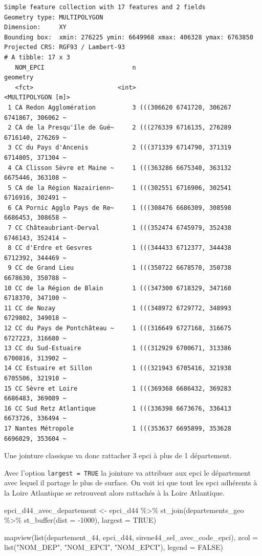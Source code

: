 \documentclass[
]{book}
\newenvironment{Shaded}{\begin{snugshade}}{\end{snugshade}}
\newcommand{\AttributeTok}[1]{\textcolor[rgb]{0.77,0.63,0.00}{#1}}
\newcommand{\ConstantTok}[1]{\textcolor[rgb]{0.00,0.00,0.00}{#1}}
\newcommand{\DecValTok}[1]{\textcolor[rgb]{0.00,0.00,0.81}{#1}}
\newcommand{\FunctionTok}[1]{\textcolor[rgb]{0.00,0.00,0.00}{#1}}
\newcommand{\NormalTok}[1]{#1}
\newcommand{\OtherTok}[1]{\textcolor[rgb]{0.56,0.35,0.01}{#1}}
\newcommand{\SpecialCharTok}[1]{\textcolor[rgb]{0.00,0.00,0.00}{#1}}
\newcommand{\StringTok}[1]{\textcolor[rgb]{0.31,0.60,0.02}{#1}}
\begin{document}
\begin{verbatim}
Simple feature collection with 17 features and 2 fields
Geometry type: MULTIPOLYGON
Dimension:     XY
Bounding box:  xmin: 276225 ymin: 6649968 xmax: 406328 ymax: 6763850
Projected CRS: RGF93 / Lambert-93
# A tibble: 17 x 3
   NOM_EPCI                        n                                    geometry
   <fct>                       <int>                          <MULTIPOLYGON [m]>
 1 CA Redon Agglomération          3 (((306620 6741720, 306267 6741867, 306062 ~
 2 CA de la Presqu'île de Gué~     2 (((276339 6716135, 276289 6716140, 276269 ~
 3 CC du Pays d'Ancenis            2 (((371339 6714790, 371319 6714805, 371304 ~
 4 CA Clisson Sèvre et Maine ~     1 (((363286 6675340, 363132 6675446, 363108 ~
 5 CA de la Région Nazairienn~     1 (((302551 6716906, 302541 6716916, 302491 ~
 6 CA Pornic Agglo Pays de Re~     1 (((308476 6686309, 308598 6686453, 308658 ~
 7 CC Châteaubriant-Derval         1 (((352474 6745979, 352438 6746143, 352414 ~
 8 CC d'Erdre et Gesvres           1 (((344433 6712377, 344438 6712392, 344469 ~
 9 CC de Grand Lieu                1 (((350722 6678570, 350738 6678630, 350788 ~
10 CC de la Région de Blain        1 (((347300 6718329, 347160 6718370, 347100 ~
11 CC de Nozay                     1 (((348972 6729772, 348993 6729802, 349018 ~
12 CC du Pays de Pontchâteau ~     1 (((316649 6727168, 316675 6727223, 316680 ~
13 CC du Sud-Estuaire              1 (((312929 6700671, 313386 6700816, 313902 ~
14 CC Estuaire et Sillon           1 (((321943 6705416, 321938 6705506, 321910 ~
15 CC Sèvre et Loire               1 (((369368 6686432, 369283 6686483, 369089 ~
16 CC Sud Retz Atlantique          1 (((336398 6673676, 336413 6673726, 336494 ~
17 Nantes Métropole                1 (((353637 6695899, 353628 6696029, 353604 ~
\end{verbatim}

Une jointure classique va donc rattacher 3 epci à plus de 1 département.

Avec l'option \texttt{largest\ =\ TRUE} la jointure va attribuer aux epci le département avec lequel il partage le plus de surface.
On voit ici que tout les epci adhérents à la Loire Atlantique se retrouvent alors rattachés à la Loire Atlantique.

\begin{Shaded}
\begin{Highlighting}[]
\NormalTok{epci\_d44\_avec\_departement }\OtherTok{\textless{}{-}}\NormalTok{ epci\_d44 }\SpecialCharTok{\%\textgreater{}\%}
  \FunctionTok{st\_join}\NormalTok{(departements\_geo }\SpecialCharTok{\%\textgreater{}\%} \FunctionTok{st\_buffer}\NormalTok{(}\AttributeTok{dist =} \SpecialCharTok{{-}}\DecValTok{1000}\NormalTok{), }\AttributeTok{largest =} \ConstantTok{TRUE}\NormalTok{)}

\FunctionTok{mapview}\NormalTok{(}\FunctionTok{list}\NormalTok{(departement\_44, epci\_d44, sirene44\_sel\_avec\_code\_epci), }\AttributeTok{zcol =} \FunctionTok{list}\NormalTok{(}\StringTok{"NOM\_DEP"}\NormalTok{, }\StringTok{"NOM\_EPCI"}\NormalTok{, }\StringTok{"NOM\_EPCI"}\NormalTok{), }
        \AttributeTok{legend =} \ConstantTok{FALSE}\NormalTok{)}
\end{Highlighting}
\end{Shaded}
\end{document}
